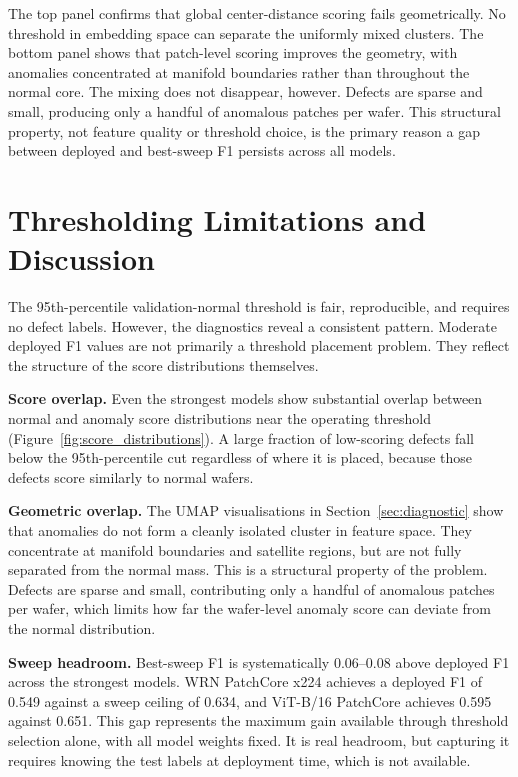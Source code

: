 \documentclass[11pt]{article}
\begin{document}
The top panel confirms that global center-distance scoring fails geometrically. No threshold in embedding space
can separate the uniformly mixed clusters. The bottom panel shows that patch-level scoring improves the geometry,
with anomalies concentrated at manifold boundaries rather than throughout the normal core. The mixing does not
disappear, however. Defects are sparse and small, producing only a handful of anomalous patches per wafer.
This structural property, not feature quality or threshold choice, is the primary reason a gap between
deployed and best-sweep F1 persists across all models.

\section{Thresholding Limitations and Discussion}
\label{sec:thresholding}

The 95th-percentile validation-normal threshold is fair, reproducible, and requires no defect labels. However, the diagnostics reveal a consistent pattern. Moderate deployed F1 values are not primarily a threshold placement problem. They reflect the structure of the score distributions themselves.

\textbf{Score overlap.} Even the strongest models show substantial overlap between normal and anomaly score distributions near the operating threshold (Figure~\ref{fig:score_distributions}). A large fraction of low-scoring defects fall below the 95th-percentile cut regardless of where it is placed, because those defects score similarly to normal wafers.

\textbf{Geometric overlap.} The UMAP visualisations in Section~\ref{sec:diagnostic} show that anomalies do not form a cleanly isolated cluster in feature space. They concentrate at manifold boundaries and satellite regions, but are not fully separated from the normal mass. This is a structural property of the problem. Defects are sparse and small, contributing only a handful of anomalous patches per wafer, which limits how far the wafer-level anomaly score can deviate from the normal distribution.

\textbf{Sweep headroom.} Best-sweep F1 is systematically $0.06$--$0.08$ above deployed F1 across the strongest models. WRN PatchCore x224 achieves a deployed F1 of 0.549 against a sweep ceiling of 0.634, and ViT-B/16 PatchCore achieves 0.595 against 0.651. This gap represents the maximum gain available through threshold selection alone, with all model weights fixed. It is real headroom, but capturing it requires knowing the test labels at deployment time, which is not available.
\end{document}
